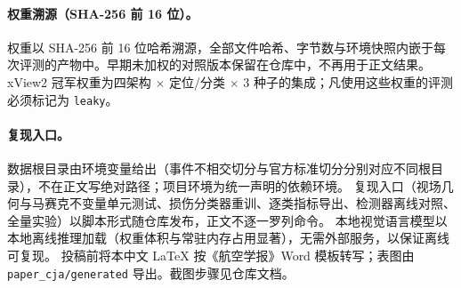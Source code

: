 \paragraph{权重溯源（SHA-256 前 16 位）。}
权重以 SHA-256 前 16 位哈希溯源，全部文件哈希、字节数与环境快照内嵌于每次评测的产物中。早期未加权的对照版本保留在仓库中，不再用于正文结果。
xView2 冠军权重为四架构 $\times$ 定位/分类 $\times$ 3 种子的集成；凡使用这些权重的评测必须标记为 \texttt{leaky}。

\paragraph{复现入口。}
数据根目录由环境变量给出（事件不相交切分与官方标准切分分别对应不同根目录），不在正文写绝对路径；项目环境为统一声明的依赖环境。
复现入口（视场几何与马赛克不变量单元测试、损伤分类器重训、逐类指标导出、检测器离线对照、全量实验）以脚本形式随仓库发布，正文不逐一罗列命令。
本地视觉语言模型以本地离线推理加载（权重体积与常驻内存占用显著），无需外部服务，以保证离线可复现。
投稿前将本中文 LaTeX 按《航空学报》Word 模板转写；表图由 \texttt{paper\_cja/generated} 导出。截图步骤见仓库文档。
